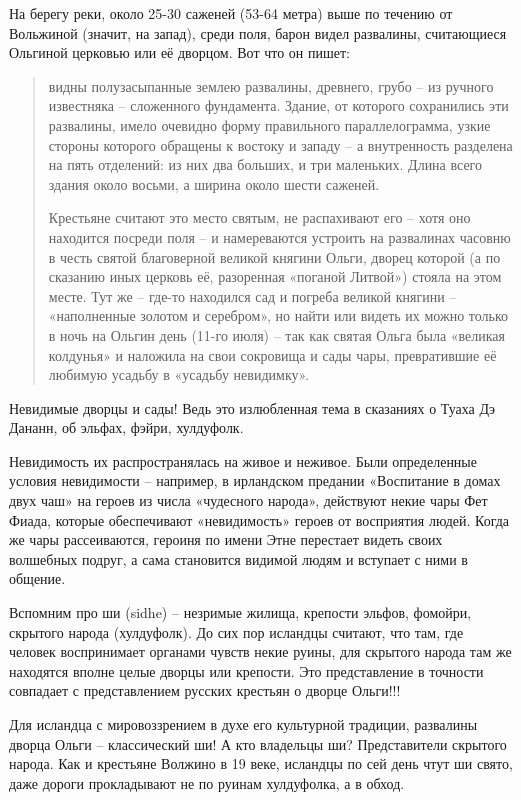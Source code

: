 На берегу реки, около 25-30 саженей (53-64 метра) выше по течению от Вольжиной (значит, на запад), среди поля, барон видел развалины, считающиеся Ольгиной церковью или её дворцом. Вот что он пишет:

\begin{quotation}
видны полузасыпанные землею развалины, древнего, грубо – из ручного известняка – сложенного фундамента. Здание, от которого сохранились эти развалины, имело очевидно форму правильного параллелограмма, узкие стороны которого обращены к востоку и западу – а внутренность разделена на пять отделений: из них два больших, и три маленьких. Длина всего здания около восьми, а ширина около шести саженей.

Крестьяне считают это место святым, не распахивают его – хотя оно находится посреди поля – и намереваются устроить на развалинах часовню в честь святой благоверной великой княгини Ольги, дворец которой (а по сказанию иных церковь её, разоренная «поганой Литвой») стояла на этом месте. Тут же – где-то находился сад и погреба великой княгини – «наполненные золотом и серебром», но найти или видеть их можно только в ночь на Ольгин день (11-го июля) – так как святая Ольга была «великая колдунья» и наложила на свои сокровища и сады чары, превратившие её любимую усадьбу в «усадьбу невидимку».
\end{quotation}

Невидимые дворцы и сады! Ведь это излюбленная тема в сказаниях о Туаха Дэ Дананн, об эльфах, фэйри, хулдуфолк.

Невидимость их распространялась на живое и неживое. Были определенные условия невидимости – например, в ирландском предании «Воспитание в домах двух чаш» на героев из числа «чудесного народа», действуют некие чары Фет Фиада, которые обеспечивают «невидимость» героев от восприятия людей. Когда же чары рассеиваются, героиня по имени Этне перестает видеть своих волшебных подруг, а сама становится видимой людям и вступает с ними в общение.

Вспомним про ши (sidhe) – незримые жилища, крепости эльфов, фомойри, скрытого народа (хулдуфолк). До сих пор исландцы считают, что там, где человек воспринимает органами чувств некие руины, для скрытого народа там же находятся вполне целые дворцы или крепости. Это представление в точности совпадает с представлением русских крестьян о дворце Ольги!!!

Для исландца с мировоззрением в духе его культурной традиции, развалины дворца Ольги – классический ши! А кто владельцы ши? Представители скрытого народа. Как и крестьяне Волжино в 19 веке, исландцы по сей день чтут ши свято, даже дороги прокладывают не по руинам хулдуфолка, а в обход.


